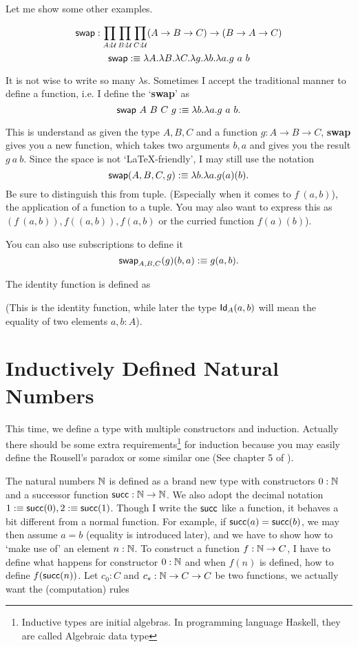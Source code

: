 Let me show some other examples.

\newcommand{\swap}{\name{swap}}

$$
    \swap: \prod_{A:\universe}\prod_{B:\universe}\prod_{C:\universe}
    (A\to B\to C)\to (B\to A\to C)
$$
$$
    \swap \defn \lambda A.\lambda B.\lambda C.\lambda g.
    \lambda b.\lambda a. g\ a\ b
$$

It is not wise to write so many $\lambda$s. Sometimes I accept the
traditional manner to define a function, i.e. I define the `{\bf swap}' as
$$
    \swap\ A\ B\ C\ g \defn \lambda b.\lambda a.g\ a\ b.
$$

This is understand as given the type $A,B,C$ and a function $g:A\to B\to C$,
{\bf swap} gives you a new function, which takes two arguments $b,a$ and gives
you the result $g\ a\ b$. Since the space is not `\LaTeX-friendly', I may still
use the notation 
$$
\swap(A,B,C,g)\defn \lambda b.\lambda a.g(a)(b).
$$
Be sure to distinguish this from tuple. (Especially when it comes to $f\ (a, b)$),
the application of a function to a tuple. You may also want to express this
as $(f\ (a, b)),f((a,b)),f(a,b)$ or the curried function $f(a)(b)$).

You can also use subscriptions to define it
$$
    \swap_{A,B,C}(g)(b,a) \defn g(a, b).
$$

The identity function is defined as
\newcommand{\id}{\name{id}}
\eq{
    \id &: \prod_{A:U} A\to A \\
    \id_A(x) &\defn x
}

\newcommand{\Id}{\name{Id}}
(This is the identity function, while later the type $\Id_A(a, b)$ 
will mean the equality of two elements $a,b:A$). 

\section{Inductively Defined Natural Numbers}
This time, we define a type with multiple constructors and induction.
Actually there should be some extra requirements\footnote{Inductive types
are initial algebras. In programming language Haskell, they are called
Algebraic data type} for induction because you may easily define the 
Rousell's paradox or some similar one (See chapter 5 of 
\cite{homotopy-type-theory}). 

The natural numbers $\mathbb{N}$ is defined as a brand new type with
constructors $0: \mathbb{N}$ and a successor function \newcommand{\succn}{\name{succ}} 
$\text{\sf succ}:\mathbb{N}\to\mathbb{N}$. We also adopt the decimal notation 
$1 \defn \succn(0), 2\defn\succn(1)$. Though I write the $\succn$ like a
function, it behaves a bit different from a normal function. For example,
if $\succn(a) = \succn(b)$, we may then assume $a = b$ (equality is introduced
later), and we have to show how to `make use of' an element $n:\mathbb{N}$.
To construct a function $f:\mathbb{N}\to C$, I have to define what happens for
constructor $0: \mathbb{N}$ and when $f(n)$ is defined, how to define $f(\succn(n))$.
Let $c_0:C$ and $c_s:\mathbb{N}\to C\to C$ be two functions, we actually want
the (computation) rules

